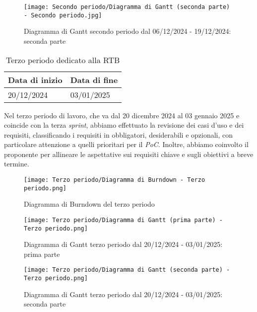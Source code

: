 \newpage

\begin{figure}[h] 
    \centering
    \texttt{[image: Secondo periodo/Diagramma di Gantt (seconda parte) - Secondo periodo.jpg]}
    \caption{Diagramma di Gantt secondo periodo dal 06/12/2024 - 19/12/2024: seconda parte} 
    \label{fig: Diagramma di Gantt primo periodo dal 06/12/2024 - 19/12/2024: seconda parte}
\end{figure}

\newpage
{}
\label{sec:terzo periodo}
\begin{table}[h!]
    \centering
    \renewcommand{\arraystretch}{1.5} %
    \begin{tabularx}{\textwidth}{|X|X|}\hline
    \rowcolor[HTML]{FFD700} 
    \textbf{Data di inizio} & \textbf{Data di fine} \\ \hline
    20/12/2024 & 03/01/2025 \\ \hline
    \end{tabularx}
    \caption{Terzo periodo dedicato alla RTB}
\end{table}
Nel terzo periodo di lavoro, che va dal 20 dicembre 2024 al 03 gennaio 2025 e coincide con la terza \textit{sprint}, abbiamo effettuato la revisione dei casi d’uso e dei requisiti, classificando i requisiti in obbligatori, desiderabili e opzionali, con particolare attenzione a quelli prioritari per il \emph{PoC}. 
Inoltre, abbiamo coinvolto il proponente per allineare le aspettative sui requisiti chiave e sugli obiettivi a breve termine.\\

\newpage
\begin{figure}[h] 
    \centering
    \texttt{[image: Terzo periodo/Diagramma di Burndown - Terzo periodo.png]}
    \caption{Diagramma di Burndown del terzo periodo} 
    \label{fig: Diagramma di Burndown del terzo periodo}
\end{figure}

\newpage
\begin{figure}[h] 
    \centering
    \texttt{[image: Terzo periodo/Diagramma di Gantt (prima parte) - Terzo periodo.png]}
    \caption{Diagramma di Gantt terzo periodo dal 20/12/2024 - 03/01/2025: prima parte} 
    \label{fig: Diagramma di Gantt terzo periodo dal 20/12/2024 - 03/01/2025: prima parte}
\end{figure}

\newpage
\begin{figure}[h] 
    \centering
    \texttt{[image: Terzo periodo/Diagramma di Gantt (seconda parte) - Terzo periodo.png]}
    \caption{Diagramma di Gantt terzo periodo dal 20/12/2024 - 03/01/2025: seconda parte} 
    \label{fig: Diagramma di Gantt terzo periodo dal 20/12/2024 - 03/01/2025: seconda parte}
\end{figure}

